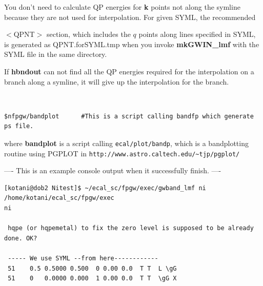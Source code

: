 \documentclass[a4paper,10pt,epsf,fleqn]{article}
\newcommand{\io}[1]{{\sf  #1}}
\begin{document}
{{You don't need to calculate QP energies for {\bf k} points
not along the symline because they are not used for interpolation.
For given SYML, the recommended {$<$QPNT$>$ section, which includes
the $q$ points along lines specified in {\sf SYML}, 
is generated as {\sf QPNT.forSYML.tmp}
when you invoke {\bf mkGWIN\_lmf} with the \io{SYML} file in the same directory.

If {\bf hbndout} can not find all the QP energies required for the interpolation
on a branch along a symline, it will give up the interpolation for the branch.

\ 

{\baselineskip=3mm \small
\begin{verbatim}
$nfpgw/bandplot      #This is a script calling bandfp which generate ps file.
\end{verbatim}}
where {\bf bandplot} is a script calling {\tt ecal/plot/bandp},
which is a bandplotting routine using 
PGPLOT in \verb#http://www.astro.caltech.edu/~tjp/pgplot/#


{\large ---- This is an example console output when it successfully finish. ----}\\
{\baselineskip=3mm \small
\begin{verbatim}
[kotani@dob2 Nitest]$ ~/ecal_sc/fpgw/exec/gwband_lmf ni
/home/kotani/ecal_sc/fpgw/exec
ni
 
 hqpe (or hqpemetal) to fix the zero level is supposed to be already done. OK?
 
 ----- We use SYML --from here------------
 51    0.5 0.5000 0.500  0 0.00 0.0  T T  L \gG  
 51    0   0.0000 0.000  1 0.00 0.0  T T  \gG X


\end{verbatim}}}}}
\end{document}
